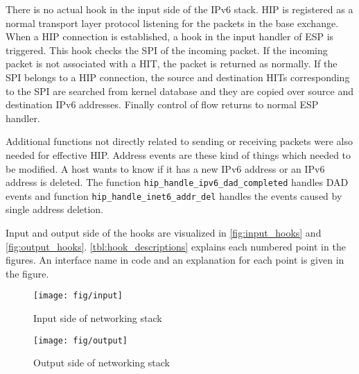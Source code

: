 There is no actual hook in the input side of the IPv6 stack. \ac{HIP}
is registered as a normal transport layer protocol listening for the
packets in the base exchange. When a \ac{HIP} connection is
established, a hook in the input handler of \ac{ESP} is
triggered. This hook checks the \ac{SPI} of the incoming packet. If
the incoming packet is not associated with a \ac{HIT}, the packet is
returned as normally. If the \ac{SPI} belongs to a \ac{HIP}
connection, the source and destination \acp{HIT} corresponding to the
\ac{SPI} are searched from kernel database and they are copied over
source and destination IPv6 addresses. Finally control of flow returns
to normal \ac{ESP} handler.

Additional functions not directly related to sending or receiving
packets were also needed for effective \ac{HIP}. Address events are
these kind of things which needed to be modified. A host wants to know
if it has a new IPv6 address or an IPv6 address is deleted. The
function \verb|hip_handle_ipv6_dad_completed| handles \ac{DAD} events
and function \verb|hip_handle_inet6_addr_del| handles the events
caused by single address deletion.

Input and output side of the hooks are visualized in
\autoref{fig:input_hooks} and \autoref{fig:output_hooks}.
\autoref{tbl:hook_descriptions} explains each numbered point in the
figures. An interface name in code and an explanation for each point
is given in the figure.

\begin{figure}
   \begin{minipage}[b]{0.5\textwidth}
      \centering
      \texttt{[image: fig/input]}
      \caption{Input side of networking stack}
      \label{fig:input_hooks}
   \end{minipage}%
   \hfill%
   \begin{minipage}[b]{0.5\textwidth}
      \centering
      \centering
      \texttt{[image: fig/output]}
      \caption{Output side of networking stack}
      \label{fig:output_hooks}
   \end{minipage}%
\end{figure}

